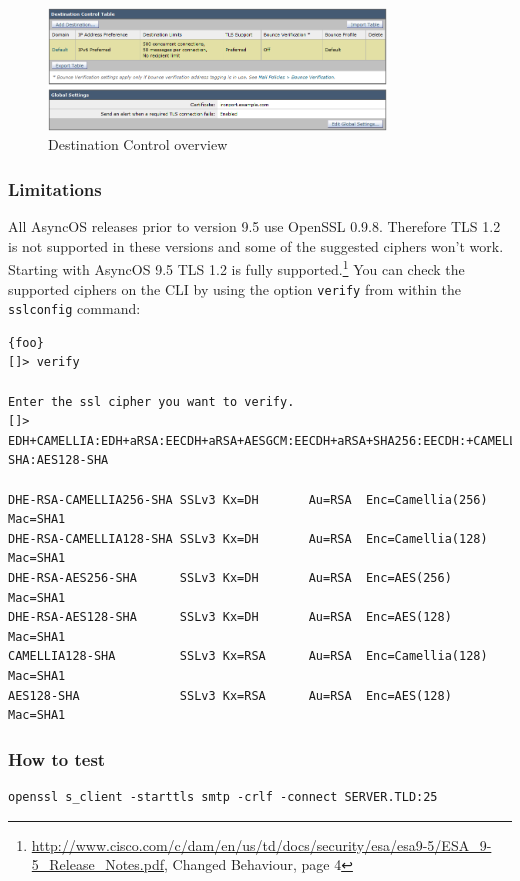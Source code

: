 \begin{figure}[p]
  \centering
  \includegraphics[width=0.8\textwidth]{img/ach_ironport_dest_control.png}
  \caption{Destination Control overview}
  \label{fig:ach_ironport_dest_control}
\end{figure}

\subsubsection{Limitations}
All AsyncOS releases prior to version 9.5 use OpenSSL 0.9.8. Therefore TLS 1.2 is not supported in these versions and some of the suggested ciphers won't work. Starting with AsyncOS 9.5 TLS 1.2 is fully supported.\footnote{\url{http://www.cisco.com/c/dam/en/us/td/docs/security/esa/esa9-5/ESA_9-5_Release_Notes.pdf}, Changed Behaviour, page 4} You can check the supported ciphers on the CLI by using the option \texttt{verify} from within the \texttt{sslconfig} command:
\begin{lstlisting}{foo}
[]> verify

Enter the ssl cipher you want to verify.
[]> EDH+CAMELLIA:EDH+aRSA:EECDH+aRSA+AESGCM:EECDH+aRSA+SHA256:EECDH:+CAMELLIA128:+AES128:+SSLv3:!aNULL:!eNULL:!LOW:!3DES:!MD5:!EXP:!PSK:!DSS:!RC4:!SEED:!IDEA:!ECDSA:kEDH:CAMELLIA128-SHA:AES128-SHA

DHE-RSA-CAMELLIA256-SHA SSLv3 Kx=DH       Au=RSA  Enc=Camellia(256) Mac=SHA1
DHE-RSA-CAMELLIA128-SHA SSLv3 Kx=DH       Au=RSA  Enc=Camellia(128) Mac=SHA1
DHE-RSA-AES256-SHA      SSLv3 Kx=DH       Au=RSA  Enc=AES(256)  Mac=SHA1
DHE-RSA-AES128-SHA      SSLv3 Kx=DH       Au=RSA  Enc=AES(128)  Mac=SHA1
CAMELLIA128-SHA         SSLv3 Kx=RSA      Au=RSA  Enc=Camellia(128) Mac=SHA1
AES128-SHA              SSLv3 Kx=RSA      Au=RSA  Enc=AES(128)  Mac=SHA1
\end{lstlisting}

\subsubsection{How to test}
\begin{lstlisting}
openssl s_client -starttls smtp -crlf -connect SERVER.TLD:25
\end{lstlisting}

\FloatBarrier %
